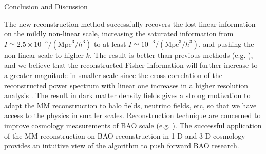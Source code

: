 \begin{section}{Conclusion and Discussion}
 \label{sec:conclusion}


   The new reconstruction method successfully recovers the lost linear information on 
the mildly non-linear scale, increasing the saturated information from 
$I \simeq 2.5 \times 10^{-5}/(\mathrm{Mpc}^3/h^3)$ to at least $I \simeq 10^{-3}/(\mathrm{Mpc}^3/h^3)$, 
and pushing the non-linear scale to higher $k$. 
The result is better than previous methods 
(e.g. \cite{bib:Mark2006,bib:Mark2009,bib:Zhang2011,bib:Yu2012,bib:Mark2014}), and
we believe that the reconstructed Fisher information will further increase to a greater magnitude in smaller scale
since the cross correlation of the reconstructed power spectrum with linear one increases                
in a higher resolution analysis \cite{bib:ZhuH2016}.
The result in dark matter density fields 
gives a strong motivation to adapt the MM reconstruction to halo fields, neutrino fields, etc, so that 
we have access to the physics in smaller scales. Reconstruction technique are concerned  
to improve cosmology measurements of BAO scale (e.g. \cite{bib:Daniel2007,bib:Martin2015}). 
The successful application of the MM reconstruction on BAO reconstruction in 1-D 
\cite{bib:Zhu2016} and 3-D \cite{bib:ZhuH2016} cosmology provides an intuitive view of the algorithm 
to push forward BAO research.


\end{section}
